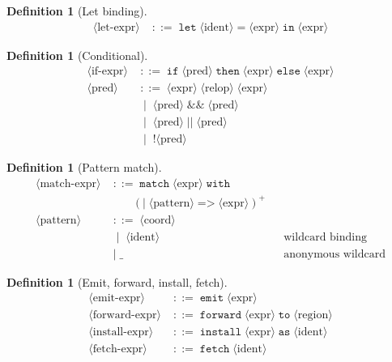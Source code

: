 \documentclass[twocolumn,11pt,a4paper]{article}
\theoremstyle{definition}
\newtheorem{definition}[theorem]{Definition}
\theoremstyle{remark}
\newcommand{\bnfeq}{\;{::=}\;}
\newcommand{\bnfor}{\;\mid\;}
\begin{document}
\begin{definition}[Let binding]
\begin{align*}
\langle\text{let-expr}\rangle
  &\bnfeq \texttt{let}\;\langle\text{ident}\rangle\;\texttt{=}\;
          \langle\text{expr}\rangle\;\texttt{in}\;\langle\text{expr}\rangle
\end{align*}
\end{definition}

\begin{definition}[Conditional]
\begin{align*}
\langle\text{if-expr}\rangle
  &\bnfeq \texttt{if}\;\langle\text{pred}\rangle\;\texttt{then}\;
          \langle\text{expr}\rangle\;\texttt{else}\;\langle\text{expr}\rangle\\
\langle\text{pred}\rangle
  &\bnfeq \langle\text{expr}\rangle\;\langle\text{relop}\rangle\;\langle\text{expr}\rangle\\
  &\bnfor \langle\text{pred}\rangle\;\texttt{\&\&}\;\langle\text{pred}\rangle\\
  &\bnfor \langle\text{pred}\rangle\;\texttt{||}\;\langle\text{pred}\rangle\\
  &\bnfor \texttt{!}\langle\text{pred}\rangle
\end{align*}
\end{definition}

\begin{definition}[Pattern match]
\begin{align*}
\langle\text{match-expr}\rangle
  &\bnfeq \texttt{match}\;\langle\text{expr}\rangle\;\texttt{with}\\
  &\quad\quad (\texttt{|}\;\langle\text{pattern}\rangle\;\texttt{=>}\;\langle\text{expr}\rangle)^+\\
\langle\text{pattern}\rangle
  &\bnfeq \langle\text{coord}\rangle\\
  &\bnfor \langle\text{ident}\rangle && \text{wildcard binding}\\
  &\bnfor \texttt{\_} && \text{anonymous wildcard}
\end{align*}
\end{definition}

\begin{definition}[Emit, forward, install, fetch]
\begin{align*}
\langle\text{emit-expr}\rangle
  &\bnfeq \texttt{emit}\;\langle\text{expr}\rangle\\
\langle\text{forward-expr}\rangle
  &\bnfeq \texttt{forward}\;\langle\text{expr}\rangle\;\texttt{to}\;\langle\text{region}\rangle\\
\langle\text{install-expr}\rangle
  &\bnfeq \texttt{install}\;\langle\text{expr}\rangle\;\texttt{as}\;\langle\text{ident}\rangle\\
\langle\text{fetch-expr}\rangle
  &\bnfeq \texttt{fetch}\;\langle\text{ident}\rangle
\end{align*}
\end{definition}
\end{document}
